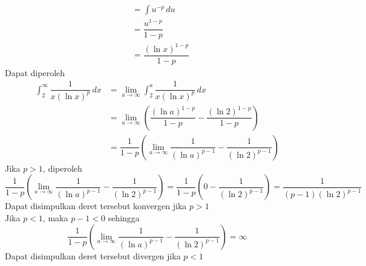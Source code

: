 \documentclass{article}
\begin{document}
\begin{enumerate}
\begin{align*}
	&= \int u^{-p} \, du\\
	&= \dfrac{u^{1-p}}{1-p}\\
	&= \dfrac{(\ln x)^{1-p}}{1-p}
	\end{align*}
	Dapat diperoleh 
	\begin{align*}
	\int_2^\infty \dfrac{1}{x(\ln x)^p}\, dx &= \lim_{a\rightarrow\infty} \int_2^a \dfrac{1}{x(\ln x)^p}\, dx\\
	&= \lim_{a\rightarrow\infty} \left(\dfrac{(\ln a)^{1-p}}{1-p}-\dfrac{(\ln 2)^{1-p}}{1-p}\right)\\
	&= \dfrac{1}{1-p}\left( \lim_{a\rightarrow\infty} \dfrac{1}{(\ln a)^{p-1}}-\dfrac{1}{(\ln 2)^{p-1}}\right)
	\end{align*}
	Jika $p>1$, diperoleh
	 $$\dfrac{1}{1-p}\left( \lim_{a\rightarrow\infty} \dfrac{1}{(\ln a)^{p-1}}-\dfrac{1}{(\ln 2)^{p-1}}\right) = \dfrac{1}{1-p}\left(0-\dfrac{1}{(\ln 2)^{p-1}}\right) = \dfrac{1}{(p-1)(\ln 2)^{p-1}}$$
	Dapat disimpulkan deret tersebut konvergen jika $p>1$\\
	Jika $p<1$, maka $p-1<0$ sehingga
	 $$\dfrac{1}{1-p}\left( \lim_{a\rightarrow\infty} \dfrac{1}{(\ln a)^{p-1}}-\dfrac{1}{(\ln 2)^{p-1}}\right) = \infty$$
	Dapat disimpulkan deret tersebut divergen jika $p<1$
\end{enumerate}
\newpage
\end{document}
